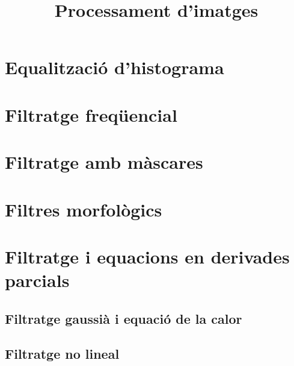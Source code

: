 \documentclass{article}
\title{Processament d'imatges}
\date{}
\begin{document}
\maketitle
\tableofcontents

\section{Equalitzaci\'o d'histograma}

\section{Filtratge freq\"uencial}

\section{Filtratge amb m\`ascares}

\section{Filtres morfol\`ogics}

\section{Filtratge i equacions en derivades parcials}

\subsection{Filtratge gaussi\`a i equaci\'o de la calor}

\subsection{Filtratge no lineal}
\end{document}
